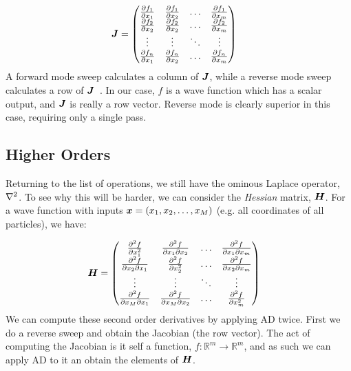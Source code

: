 \documentclass[Thesis.tex]{subfiles}
\begin{document}
\begin{align}
  \bm{J} &=
  \begin{pmatrix}
    \pdv{f_1}{x_1} & \pdv{f_1}{x_2} & \dots & \pdv{f_1}{x_m}\\
    \pdv{f_2}{x_2} & \pdv{f_2}{x_2} & \dots & \pdv{f_2}{x_m}\\
    \vdots & \vdots & \ddots & \vdots\\
    \pdv{f_n}{x_1} & \pdv{f_n}{x_2} & \dots & \pdv{f_n}{x_m}\\
  \end{pmatrix}
\end{align}
A forward mode sweep calculates a column of $\bm{J}$,
while a reverse mode sweep calculates a row of $\bm{J}$~\cite{auto-diff-Berland}. In our case, $f$ is a wave function which has a
scalar output, and $\bm{J}$ is really a row vector. Reverse mode is clearly
superior in this case, requiring only a single pass.\\

\subsection{Higher Orders}

Returning to the list of operations, we still have the ominous Laplace
operator, $\laplacian$. To see why this will be harder, we can consider the
\emph{Hessian} matrix, $\bm{H}$.
For a wave function with inputs $\bm{x} = (x_1, x_2,\dots, x_M)$ (e.g. all
coordinates of all particles), we have:

\begin{align}
  \bm{H} &=
  \begin{pmatrix}
    \pdv[2]{f}{x_1} & \pdv{f}{x_1}{x_2} & \dots & \pdv{f}{x_1}{x_m}\\
    \pdv{f}{x_2}{x_1} & \pdv[2]{f}{x_2} & \dots & \pdv{f}{x_2}{x_m}\\
    \vdots & \vdots & \ddots & \vdots\\                          
    \pdv{f}{x_M}{x_1} & \pdv{f}{x_M}{x_2} & \dots & \pdv[2]{f}{x_m}\\
  \end{pmatrix}
\end{align}
We can compute these second order derivatives by applying AD twice. First we do
a reverse sweep and obtain the Jacobian (the row vector). The act of computing
the Jacobian is it self a function, $f: \mathbb{R}^m\to\mathbb{R}^m$, and as
such we can apply AD to it an obtain the elements of $\bm{H}$.\\
\end{document}
